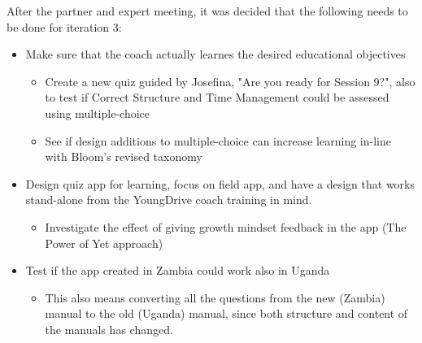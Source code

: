 After the partner and expert meeting, it was decided that the following needs to be done for iteration 3:

\begin{itemize}
  \item Make sure that the coach actually learnes the desired educational objectives
  \begin{itemize}
    \item Create a new quiz guided by Josefina, "Are you ready for Session 9?", also to test if Correct Structure and Time Management could be assessed using multiple-choice
    \item See if design additions to multiple-choice can increase learning in-line with Bloom's revised taxonomy
  \end{itemize}
  \item Design quiz app for learning, focus on field app, and have a design that works stand-alone from the YoungDrive coach training in mind.
  \begin{itemize}
    \item Investigate the effect of giving growth mindset feedback in the app (The Power of Yet approach)
  \end{itemize}
  \item Test if the app created in Zambia could work also in Uganda
    \begin{itemize}
      \item This also means converting all the questions from the new (Zambia) manual to the old (Uganda) manual, since both structure and content of the manuals has changed.
    \end{itemize}
\end{itemize}
